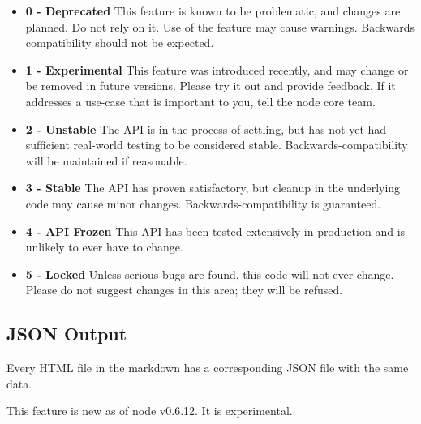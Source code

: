 \begin{itemize}
\item
  \textbf{0 - Deprecated} This feature is known to be problematic, and
  changes are planned. Do not rely on it. Use of the feature may cause
  warnings. Backwards compatibility should not be expected.
\item
  \textbf{1 - Experimental} This feature was introduced recently, and
  may change or be removed in future versions. Please try it out and
  provide feedback. If it addresses a use-case that is important to you,
  tell the node core team.
\item
  \textbf{2 - Unstable} The API is in the process of settling, but has
  not yet had sufficient real-world testing to be considered stable.
  Backwards-compatibility will be maintained if reasonable.
\item
  \textbf{3 - Stable} The API has proven satisfactory, but cleanup in
  the underlying code may cause minor changes. Backwards-compatibility
  is guaranteed.
\item
  \textbf{4 - API Frozen} This API has been tested extensively in
  production and is unlikely to ever have to change.
\item
  \textbf{5 - Locked} Unless serious bugs are found, this code will not
  ever change. Please do not suggest changes in this area; they will be
  refused.
\end{itemize}

\subsection{JSON Output}

\begin{Shaded}
\begin{Highlighting}[]
\NormalTok{: } 
\end{Highlighting}
\end{Shaded}

Every HTML file in the markdown has a corresponding JSON file with the
same data.

This feature is new as of node v0.6.12. It is experimental.
